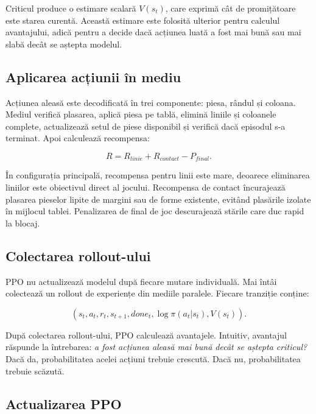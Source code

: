 \documentclass[12pt,a4paper]{article}
\begin{document}
Criticul produce o estimare scalară $V(s_t)$, care exprimă cât de promițătoare este starea curentă. Această estimare este folosită ulterior pentru calculul avantajului, adică pentru a decide dacă acțiunea luată a fost mai bună sau mai slabă decât se aștepta modelul.

\subsection{Aplicarea acțiunii în mediu}

Acțiunea aleasă este decodificată în trei componente: piesa, rândul și coloana. Mediul verifică plasarea, aplică piesa pe tablă, elimină liniile și coloanele complete, actualizează setul de piese disponibil și verifică dacă episodul s-a terminat. Apoi calculează recompensa:

\begin{equation}
    R = R_{linie} + R_{contact} - P_{final}.
\end{equation}

În configurația principală, recompensa pentru linii este mare, deoarece eliminarea liniilor este obiectivul direct al jocului. Recompensa de contact încurajează plasarea pieselor lipite de margini sau de forme existente, evitând plasările izolate în mijlocul tablei. Penalizarea de final de joc descurajează stările care duc rapid la blocaj.

\subsection{Colectarea rollout-ului}

PPO nu actualizează modelul după fiecare mutare individuală. Mai întâi colectează un rollout de experiențe din mediile paralele. Fiecare tranziție conține:

\begin{equation}
    (s_t, a_t, r_t, s_{t+1}, done_t, \log \pi(a_t|s_t), V(s_t)).
\end{equation}

După colectarea rollout-ului, PPO calculează avantajele. Intuitiv, avantajul răspunde la întrebarea: \textit{a fost acțiunea aleasă mai bună decât se aștepta criticul?} Dacă da, probabilitatea acelei acțiuni trebuie crescută. Dacă nu, probabilitatea trebuie scăzută.

\subsection{Actualizarea PPO}
\end{document}
